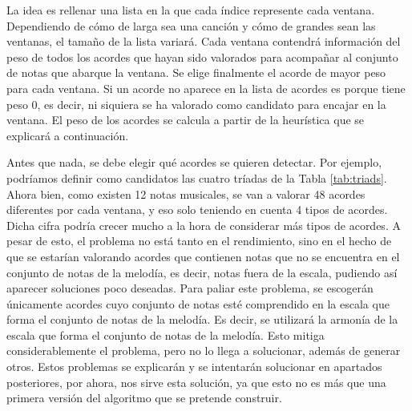     La idea es rellenar una lista en la que cada índice represente cada ventana. Dependiendo de cómo de larga sea una canción y cómo de grandes sean las ventanas, el tamaño de la lista variará. Cada ventana contendrá información del peso de todos los acordes que hayan sido valorados para acompañar al conjunto de notas que abarque la ventana. Se elige finalmente el acorde de mayor peso para cada ventana. Si un acorde no aparece en la lista de acordes es porque tiene peso 0, es decir, ni siquiera se ha valorado como candidato para encajar en la ventana. El peso de los acordes se calcula a partir de la heurística que se explicará a continuación.

    \label{arm:problema_acordes}
    Antes que nada, se debe elegir qué acordes se quieren detectar. Por ejemplo, podríamos definir como candidatos las cuatro tríadas de la Tabla \ref{tab:triads}. Ahora bien, como existen 12 notas musicales, se van a valorar 48 acordes diferentes por cada ventana, y eso solo teniendo en cuenta 4 tipos de acordes. Dicha cifra podría crecer mucho a la hora de considerar más tipos de acordes. A pesar de esto, el problema no está tanto en el rendimiento, sino en el hecho de que se estarían valorando acordes que contienen notas que no se encuentra en el conjunto de notas de la melodía, es decir, notas fuera de la escala, pudiendo así aparecer soluciones poco deseadas. Para paliar este problema, se escogerán únicamente acordes cuyo conjunto de notas esté comprendido en la escala que forma el conjunto de notas de la melodía. Es decir, se utilizará la armonía de la escala que forma el conjunto de notas de la melodía. Esto mitiga considerablemente el problema, pero no lo llega a solucionar, además de generar otros. Estos problemas se explicarán y se intentarán solucionar en apartados posteriores, por ahora, nos sirve esta solución, ya que esto no es más que una primera versión del algoritmo que se pretende construir.

